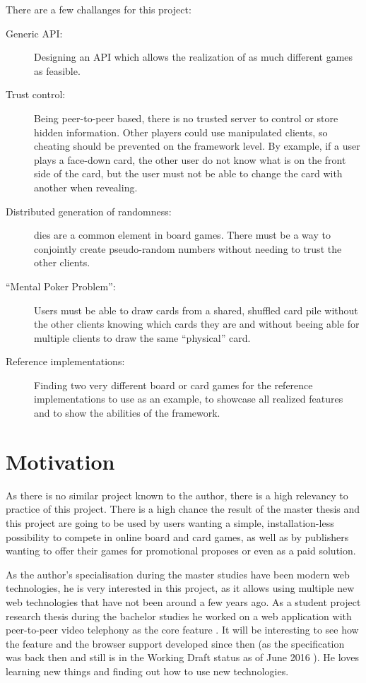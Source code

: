 There are a few challanges for this project:

\begin{description}
  \item[Generic \gls{API}:] Designing an \gls{API} which allows the realization
  of as much different games as feasible.
  \item[Trust control:] Being \gls{peer-to-peer} based, there is no trusted
  server to control or store \gls{hidden information}. Other players could use
  manipulated clients, so cheating should be prevented on the framework level.
  By example, if a user plays a \gls{face}-down \gls{card}, the other user
  do not know what is on the front side of the card, but the user must not be
  able to change the card with another when revealing.
  \item[Distributed generation of randomness:] \Glspl{die} are a common element
  in board games. There must be a way to conjointly create pseudo-random numbers
  without needing to trust the other clients.
  \item[“Mental Poker Problem”:] Users must be able to draw \glspl{card} from a
  shared, shuffled card pile without the other clients knowing which
  \glspl{card} they are and without beeing able for multiple clients to draw the
  same “physical” \gls{card}.
  \item[Reference implementations:] Finding two very different board or card
  games for the reference implementations to use as an example, to showcase all
  realized features and to show the abilities of the framework.
\end{description}

\section{Motivation}

As there is no similar project known to the author, there is a high relevancy to
practice of this project. There is a high chance the result of the master thesis
and this project are going to be used by users wanting a simple,
installation-less possibility to compete in online board and card games, as well
as by publishers wanting to offer their games for promotional proposes or even
as a paid solution.

As the author's specialisation during the master studies have been modern web
technologies, he is very interested in this project, as it allows using multiple
new web technologies that have not been around a few years ago. As a student
project research thesis during the bachelor studies he worked on a web
application with \gls{peer-to-peer} video telephony as the core feature
\cite{blaser2013practical}. It will be interesting to see how the feature and
the browser support developed since then (as the specification was back then and
still is in the Working Draft status as of June 2016 \cite{w3c2016webrtc}). He
loves learning new things and finding out how to use new technologies.

